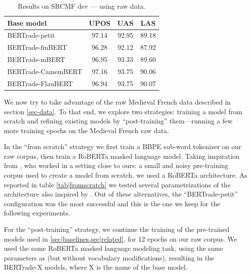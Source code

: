 \begin{table}[tbh]
    \centering
    \tablefontsize
    \begin{tabular}{l*{3}{S[table-format=2.2]}}
        \toprule
        {\textbf{Base model}} & {\textbf{UPOS}} & {\textbf{UAS}} & {\textbf{LAS}}\\
        \midrule
        BERTrade-petit      & 97.14 & 92.95 & 89.18\\
        \midrule
        BERTrade-finBERT    & 96.28 & 92.12 & 87.92\\
        BERTrade-mBERT      & 96.95 & 93.33 & 89.60\\
        BERTrade-CamemBERT  & 97.16 & 93.75 & 90.06\\
        BERTrade-FlauBERT   & 96.94 & 93.75 & 90.07\\
        \bottomrule
    \end{tabular}
    \caption{Results on SRCMF dev — using raw data.}\label{tab|post-train}
\end{table}

We now try to take advantage of the raw Medieval French data described in section \ref{sec-data}.
To that end, we explore two strategies: training a model from scratch and refining existing models by \enquote{post-training} them---running a few more training epochs on the Medieval French raw data.

In the \enquote{from scratch} strategy we first train a BBPE sub-word tokenizer \citep{wang2020NeuralMachineTranslation}
on our raw corpus, then train a RoBERTa \citep{liu2019RoBERTaRobustlyOptimized} masked language model.
Taking inspiration from \citet{micheli-etal-2020-importance}, who worked in a setting close to ours: a small and noisy pre-training corpus used to create a model from scratch, we used a RoBERTa architecture.
As reported in table \cref{tab|fromscratch} we tested several parametrizations of the architecture
also inspired by \citet{turc2019WellReadStudentsLearn}.  
Out of these alternatives, the \enquote{BERTrade-petit} configuration was the 
most successful and this is the one we keep for the following experiments.

For the \enquote{post-training} strategy, we continue the training of the pre-trained models used in \cref{sec|baselines,sec|related}, for \num{12} epochs on our raw corpus. We used the same RoBERTa masked language modeling task, using the same parameters as \citet{wang-etal-2020-extending} (but without vocabulary modifications), resulting in the BERTrade-X models, where X is the name of the base model.

